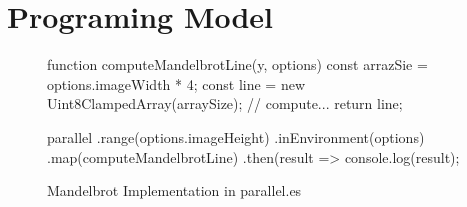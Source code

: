 \section{Programing Model}\label{sec:programing-model}

\begin{figure}
	\begin{javascriptcode}
function computeMandelbrotLine(y, options) {
	const arrazSie = options.imageWidth * 4;
	const line = new Uint8ClampedArray(arraySize);
	// compute...
	return line;
}

parallel
	.range(options.imageHeight)
	.inEnvironment(options)
	.map(computeMandelbrotLine)
	.then(result => console.log(result);
	\end{javascriptcode}
	
	\caption{Mandelbrot Implementation in parallel.es}
\end{figure}